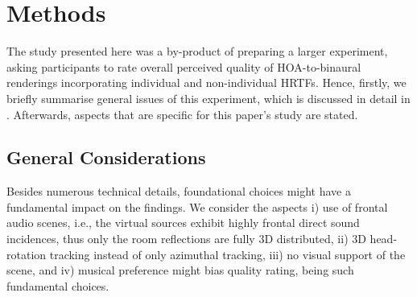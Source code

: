 \documentclass[conference]{IEEEtran}
\begin{document}
\section{Methods}
%
The study presented here was a by-product of preparing a larger experiment, asking participants to rate overall perceived quality of HOA-to-binaural renderings incorporating individual and non-individual HRTFs.
%
Hence, firstly, we briefly summarise general issues of this experiment, which is discussed in detail in \cite{Schultz2023_Acta}.
%
Afterwards, aspects that are specific for this paper's study are stated.

\subsection{General Considerations}

Besides numerous technical details, foundational choices might have a fundamental impact on the findings.
%
We consider the aspects i) use of frontal audio scenes, i.e., the virtual sources exhibit highly frontal direct sound incidences, thus only the room reflections are fully 3D distributed, ii) 3D head-rotation tracking instead of only azimuthal tracking, iii) no visual support of the scene, and iv) musical preference might bias quality rating, being such fundamental choices.
\end{document}
